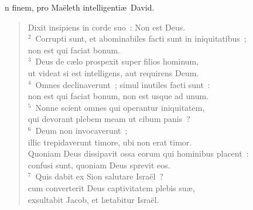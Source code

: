 \bchapter
{}n finem, pro Ma\"eleth intelligenti\ae\ David. \begin{flushleft}\begin{verse}\vspace{6pt}Dixit insipiens in corde suo~: Non est Deus.\\
${}^{2}$~Corrupti sunt, et abominabiles facti sunt in iniquitatibus~;\\ non est qui faciat bonum.\\
${}^{3}$~Deus de c\ae lo prospexit super filios hominum,\\ ut videat si est intelligens, aut requirens Deum.\\
${}^{4}$~Omnes declinaverunt~; simul inutiles facti sunt~:\\ non est qui faciat bonum, non est usque ad unum.\\
${}^{5}$~Nonne scient omnes qui operantur iniquitatem,\\ qui devorant plebem meam ut cibum panis~?\\
${}^{6}$~Deum non invocaverunt~;\\ illic trepidaverunt timore, ubi non erat timor.\\ Quoniam Deus dissipavit ossa eorum qui hominibus placent~:\\ confusi sunt, quoniam Deus sprevit eos.\\
${}^{7}$~Quis dabit ex Sion salutare Isra\"el~?\\ cum converterit Deus captivitatem plebis su\ae ,\\ exsultabit Jacob, et l\ae tabitur Isra\"el.\end{verse}\end{flushleft}



